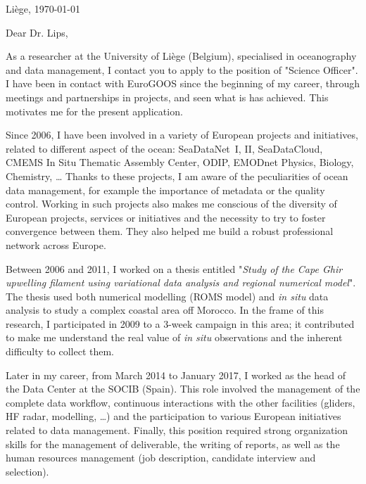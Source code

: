 \documentclass[svgnames]{article}
\begin{document}
\pagestyle{empty}
\thispagestyle{empty}

%

\hfill Liège, \today

\vspace{.5cm}

Dear Dr. Lips,

\vspace{.5cm}

As a researcher at the University of Liège (Belgium), specialised in oceanography and data management, I contact you to apply to the position of "Science Officer". I have been in contact with EuroGOOS since the beginning of my career, through meetings and partnerships in projects, and seen what is has achieved. This motivates me for the present application. 

Since 2006, I have been involved in a variety of European projects and initiatives, related to different aspect of the ocean: SeaDataNet~I, II, SeaDataCloud, CMEMS In Situ Thematic Assembly Center, ODIP, EMODnet Physics, Biology, Chemistry, \ldots 
Thanks to these projects, I am aware of the peculiarities of ocean data management, for example the importance of metadata or the quality control. Working in such projects also makes me conscious of the diversity of European projects, services or initiatives and the necessity to try to foster convergence between them. They also helped me build a robust professional network across Europe. 

Between 2006 and 2011, I worked on a thesis entitled "\textit{Study of the Cape Ghir upwelling filament using variational data analysis and regional numerical model}". The thesis used both numerical modelling (ROMS model) and \textit{in situ} data analysis to study a complex coastal area off Morocco. In the frame of this research, I participated in 2009 to a 3-week campaign in this area; it contributed to make me understand the real value of \textit{in situ} observations and the inherent difficulty to collect them.

Later in my career, from March 2014 to January 2017, I worked as the head of the Data Center at the SOCIB (Spain). This role involved the management of the complete data workflow, continuous interactions with the other facilities (gliders, HF radar, modelling, \ldots) and the participation to various European initiatives related to data management. Finally, this position required strong organization skills for the management of deliverable, the writing of reports, as well as the human resources management (job description, candidate interview and selection).
\end{document}

